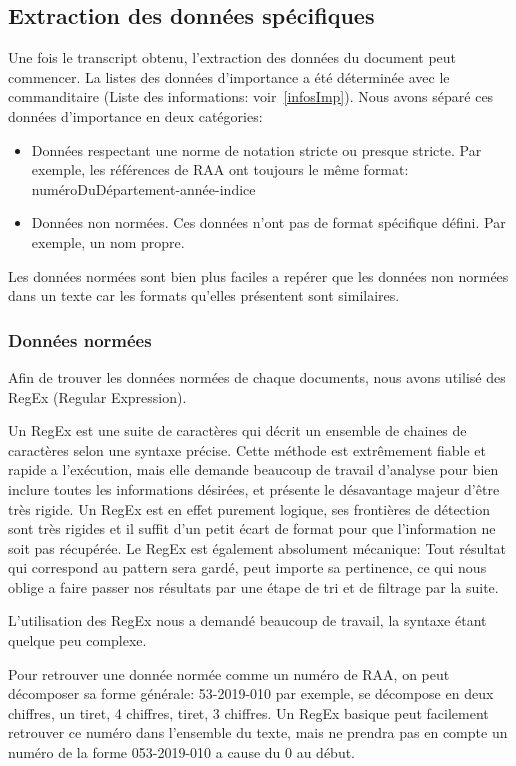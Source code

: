 \subsection{Extraction des données spécifiques}
Une fois le transcript obtenu, l'extraction des données du document peut commencer.
La listes des données d'importance a été déterminée avec le commanditaire (Liste des informations: voir~\ref{infosImp}).
Nous avons séparé ces données d'importance en deux catégories:
\begin{itemize}
\item Données respectant une norme de notation stricte ou presque stricte.\newline
Par exemple, les références de RAA ont toujours le même format: numéroDuDépartement-année-indice
\item Données non normées.\newline
Ces données n'ont pas de format spécifique défini.
Par exemple, un nom propre.
\end{itemize}

Les données normées sont bien plus faciles a repérer que les données non normées dans un texte car les formats qu'elles présentent sont similaires.

\subsubsection{Données normées}
Afin de trouver les données normées de chaque documents, nous avons utilisé des RegEx (Regular Expression).

Un RegEx est une suite de caractères qui décrit un ensemble de chaines de caractères selon une syntaxe précise.
Cette méthode est extrêmement fiable et rapide a l'exécution, mais elle demande beaucoup de travail d'analyse pour bien inclure toutes les informations désirées, et présente le désavantage majeur d'être très rigide.
Un RegEx est en effet purement logique, ses frontières de détection sont très rigides et il suffit d'un petit écart de format pour que l'information ne soit pas récupérée.
Le RegEx est également absolument mécanique: Tout résultat qui correspond au pattern sera gardé, peut importe sa pertinence, ce qui nous oblige a faire passer nos résultats par une étape de tri et de filtrage par la suite.

L'utilisation des RegEx nous a demandé beaucoup de travail, la syntaxe étant quelque peu complexe.

Pour retrouver une donnée normée comme un numéro de RAA, on peut décomposer sa forme générale: 53-2019-010 par exemple, se décompose en deux chiffres, un tiret, 4 chiffres, tiret, 3 chiffres.
Un RegEx basique peut facilement retrouver ce numéro dans l'ensemble du texte, mais ne prendra pas en compte un numéro de la forme 053-2019-010 a cause du 0 au début.

